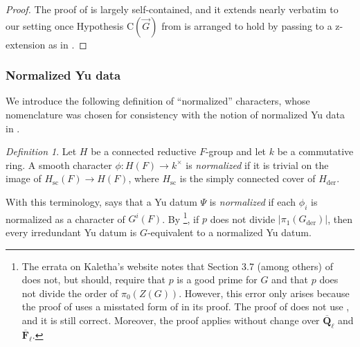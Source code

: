 \documentclass[reqno]{amsart}
\numberwithin{equation}{subsection}
\newcommand{\F}{\mathbf{F}}
\newcommand{\Q}{\mathbf{Q}}
\newcommand{\Z}{\mathbf{Z}}
\newcommand{\ol}[1]{\overline{#1}}
\newcommand{\co}{\colon}
\DeclareMathOperator{\der}{der}
\theoremstyle{remark}
\newtheorem{defn}[thm]{Definition}
\numberwithin{equation}{subsection}
\numberwithin{figure}{subsection}
\begin{document}
\begin{proof}
The proof of \cite[Proposition 4.24]{HM08} is largely self-contained, and it extends nearly verbatim to our setting once Hypothesis $\mathrm{C}(\vec G)$ from \cite[\S 4.3]{HM08} is arranged to hold by passing to a z-extension as in \cite[Lemmas 3.5.2--3.5.4]{Kal19}.
\end{proof}

\subsubsection{Normalized Yu data}
We introduce the following definition of ``normalized'' characters, whose nomenclature was chosen for consistency with the notion of normalized Yu data in \cite[Definition 3.7.1]{Kal19}.

\begin{defn}\label{def:normalized-character}
Let $H$ be a connected reductive $F$-group and let $k$ be a
commutative ring.  A smooth character
$\phi\co H(F)\to k^\times$ is \textit{normalized} if it is trivial on
the image of $H_{\mathrm{sc}}(F)\to H(F)$, where $H_{\mathrm{sc}}$ is
the simply connected cover of $H_{\der}$.
\end{defn}

With this terminology, \cite[Definition 3.7.1]{Kal19} says that a Yu datum $\Psi$ is \textit{normalized} if each $\phi_i$ is normalized as a character of $G^i(F)$. By \cite[Lemma 3.7.2]{Kal19}\footnote{The errata on Kaletha's website notes that Section 3.7 (among others) of \cite{Kal19} does not, but should, require that $p$ is a good prime for $G$ and that $p$ does not divide the order of $\pi_0(Z(G))$. However, this error only arises because the proof of \cite[Lemma 3.6.8]{Kal19} uses a misstated form of \cite[Lemma 8.1]{Yu01} in its proof. The proof of \cite[Lemma 3.7.2]{Kal19} does not use \cite[Lemma 3.6.8]{Kal19}, and it is still correct. Moreover, the proof applies without change over $\ol\Q_\ell$ and $\ol\F_\ell$.}, if $p$ does not divide $|\pi_1(G_{\mathrm{der}})|$, then every irredundant Yu datum is $G$-equivalent to a normalized Yu datum. 
\end{document}
